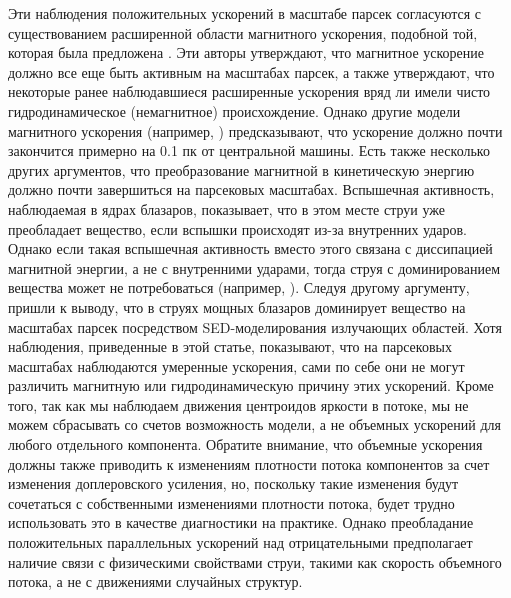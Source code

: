 Эти наблюдения положительных ускорений в масштабе парсек согласуются с существованием расширенной
области магнитного ускорения, подобной той, которая была предложена \cite{Vlahakis_2004}. Эти
авторы утверждают, что магнитное ускорение должно все еще быть активным на масштабах парсек, а
также утверждают, что некоторые ранее наблюдавшиеся расширенные ускорения вряд ли имели чисто
гидродинамическое (немагнитное) происхождение. Однако другие модели магнитного ускорения (например,
\cite{Granot_2011,McKinney_2006}) предсказывают, что ускорение должно почти закончится примерно на
0.1 пк от центральной машины. Есть также несколько других аргументов, что преобразование
магнитной в кинетическую энергию должно почти завершиться на парсековых масштабах. Вспышечная
активность, наблюдаемая в ядрах блазаров, показывает, что в этом месте струи уже преобладает
вещество, если вспышки происходят из-за внутренних ударов. Однако если такая вспышечная активность
вместо этого связана с диссипацией магнитной энергии, а не с внутренними ударами, тогда струя с
доминированием вещества может не потребоваться (например, \cite{Giannios_2011,Sikora_2005}). Следуя
другому аргументу, \cite{Celotti_2008} пришли к выводу, что в струях мощных блазаров
доминирует вещество на масштабах парсек посредством SED-моделирования излучающих областей. Хотя
наблюдения, приведенные в этой статье, показывают, что на парсековых масштабах наблюдаются умеренные
ускорения, сами по себе они не могут различить магнитную или гидродинамическую причину этих
ускорений. Кроме того, так как мы наблюдаем движения центроидов яркости в потоке, мы не можем
сбрасывать со счетов возможность модели, а не объемных ускорений для любого отдельного компонента.
Обратите внимание, что объемные ускорения должны также приводить к изменениям плотности потока
компонентов за счет изменения доплеровского усиления, но, поскольку такие изменения будут сочетаться
с собственными изменениями плотности потока, будет трудно использовать это в качестве диагностики на
практике. Однако преобладание положительных параллельных ускорений над отрицательными предполагает
наличие связи с физическими свойствами струи, такими как скорость объемного потока, а не с
движениями случайных структур.

